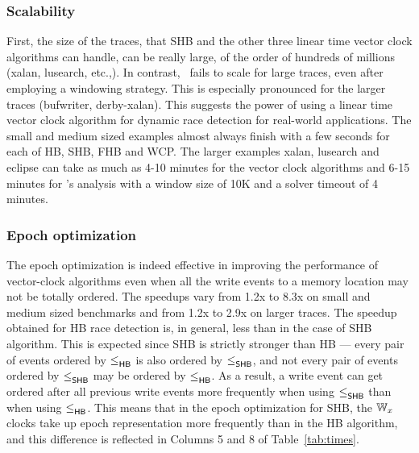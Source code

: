 


% 
\subsubsection{Scalability}
First, the size of the traces, that SHB and the other three
linear time vector clock algorithms can handle, can be really large,
of the order of hundreds of millions (\textsf{xalan}, \textsf{lusearch}, etc.,).
In contrast, \rvpredict~fails to scale for large traces, even after
employing a windowing strategy.
This is especially pronounced for the larger traces 
(\textsf{bufwriter}, \textsf{derby}-\textsf{xalan}).
This suggests the power of using a linear time vector clock algorithm
for dynamic race detection for real-world applications.
The small and medium sized examples almost always
finish with a few seconds for each of HB, SHB, FHB and WCP.
The larger examples \textsf{xalan}, \textsf{lusearch}
and \textsf{eclipse} can take as much as 4-10 minutes
for the vector clock algorithms and 6-15 minutes for
\rvpredict's analysis with a window size of 10K and a solver timeout
of 4 minutes.

\subsubsection{Epoch optimization}
The epoch optimization is indeed effective in improving the
performance of vector-clock algorithms even when all the write events
to a memory location may not be totally ordered.  The speedups vary
from 1.2x to 8.3x on small and medium sized benchmarks and from 1.2x
to 2.9x on larger traces.  The speedup obtained for HB race detection
is, in general, less than in the case of SHB algorithm.  This is
expected since SHB is strictly stronger than HB --- every pair of
events ordered by $\leq^{}_{\mathsf{HB}}$ is also ordered by $\leq^{}_{\mathsf{SHB}}$, and not every
pair of events ordered by $\leq^{}_{\mathsf{SHB}}$ may be ordered by $\leq^{}_{\mathsf{HB}}$.  As a
result, a write event can get ordered after all previous write events
more frequently when using $\leq^{}_{\mathsf{SHB}}$ than when using $\leq^{}_{\mathsf{HB}}$.  This
means that in the epoch optimization for SHB, the $\mathbb{W}_x$ clocks take
up epoch representation more frequently than in the HB algorithm, and
this difference is reflected in Columns 5 and 8 of
Table~\ref{tab:times}.

